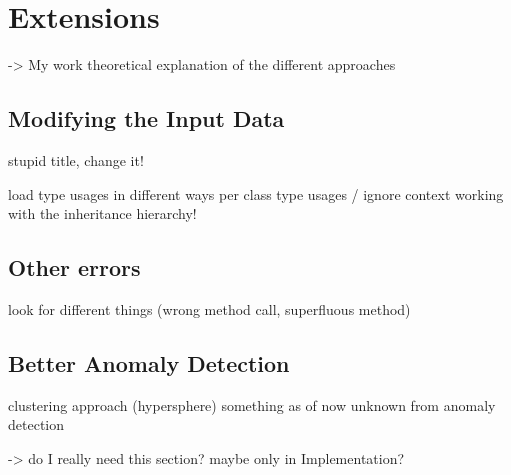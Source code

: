\section{Extensions}
-> My work
theoretical explanation of the different approaches

\subsection{Modifying the Input Data}
stupid title, change it!

load type usages in different ways
    per class type usages / ignore context
    working with the inheritance hierarchy!

\subsection{Other errors}
    look for different things (wrong method call, superfluous method)

\subsection{Better Anomaly Detection}
    clustering approach (hypersphere)
    something as of now unknown from anomaly detection

    -> do I really need this section? maybe only in Implementation?
